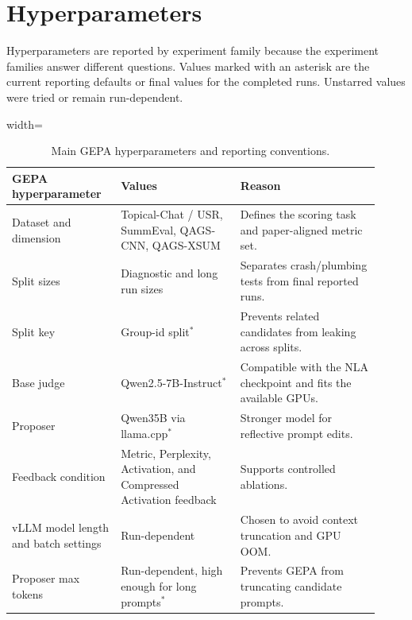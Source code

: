 \documentclass[12pt,a4paper,twoside,openright]{book}
\begin{document}
\section{Hyperparameters}
\label{sec:setup-hyperparameters}

Hyperparameters are reported by experiment family because the experiment families answer
different questions. Values marked with an asterisk are the current reporting
defaults or final values for the completed runs. Unstarred values were tried or
remain run-dependent.

\begin{table}[!htb]
    \centering
    \scriptsize
    \begin{adjustbox}{width=\textwidth}
    \begin{tabular}{p{0.27\linewidth} p{0.30\linewidth} p{0.35\linewidth}}
        \toprule
        \textbf{GEPA hyperparameter} & \textbf{Values} & \textbf{Reason} \\
        \midrule
        Dataset and dimension &
        Topical-Chat / USR, SummEval, QAGS-CNN, QAGS-XSUM &
        Defines the scoring task and paper-aligned metric set. \\
        Split sizes &
        Diagnostic and long run sizes &
        Separates crash/plumbing tests from final reported runs. \\
        Split key &
        Group-id split$^*$ &
        Prevents related candidates from leaking across splits. \\
        Base judge &
        Qwen2.5-7B-Instruct$^*$ &
        Compatible with the NLA checkpoint and fits the available GPUs. \\
        Proposer &
        Qwen35B via llama.cpp$^*$ &
        Stronger model for reflective prompt edits. \\
        Feedback condition &
        Metric, Perplexity, Activation, and Compressed Activation feedback &
        Supports controlled ablations. \\
        vLLM model length and batch settings &
        Run-dependent &
        Chosen to avoid context truncation and GPU OOM. \\
        Proposer max tokens &
        Run-dependent, high enough for long prompts$^*$ &
        Prevents GEPA from truncating candidate prompts. \\
        \bottomrule
    \end{tabular}
    \end{adjustbox}
    \caption{Main GEPA hyperparameters and reporting conventions.}
    \label{tab:gepa-hyperparameters}
\end{table}
\end{document}
